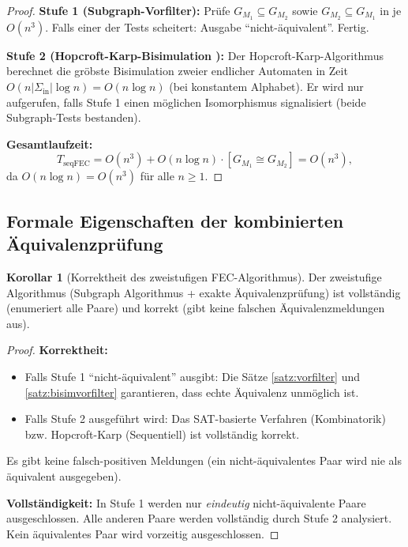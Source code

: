 ﻿\documentclass[a4paper,12pt]{article}
\theoremstyle{definition}
\newtheorem{korollar}{Korollar}
\begin{document}
\begin{proof}
  \textbf{Stufe 1 (Subgraph-Vorfilter):}
  Prüfe $G_{M_1} \subseteq G_{M_2}$ sowie $G_{M_2} \subseteq G_{M_1}$ in je $O(n^3)$.
  Falls einer der Tests scheitert: Ausgabe ``nicht-äquivalent''. Fertig.

  \textbf{Stufe 2 (Hopcroft-Karp-Bisimulation \cite{hopcroft1971}):}
  Der Hopcroft-Karp-Algorithmus berechnet die gröbste Bisimulation zweier endlicher
  Automaten in Zeit $O(n |\Sigma_{\text{in}}| \log n) = O(n \log n)$ (bei konstantem
  Alphabet). Er wird nur aufgerufen, falls Stufe 1 einen möglichen Isomorphismus
  signalisiert (beide Subgraph-Tests bestanden).

  \textbf{Gesamtlaufzeit:}
  \[
    T_{\text{seqFEC}} = O(n^3) + O(n \log n) \cdot [G_{M_1} \cong G_{M_2}]
    = O(n^3),
  \]
  da $O(n \log n) = O(n^3)$ für alle $n \geq 1$.
\end{proof}

\subsection{Formale Eigenschaften der kombinierten Äquivalenzprüfung}

\begin{korollar}[Korrektheit des zweistufigen FEC-Algorithmus]\label{kor:feckorrekt}
  Der zweistufige Algorithmus (Subgraph Algorithmus + exakte Äquivalenzprüfung) ist
  vollständig (enumeriert alle Paare) und korrekt (gibt keine falschen Äquivalenzmeldungen
  aus).
\end{korollar}

\begin{proof}
  \textbf{Korrektheit:}
  \begin{itemize}
    \item Falls Stufe 1 ``nicht-äquivalent'' ausgibt: Die Sätze \ref{satz:vorfilter}
          und \ref{satz:bisimvorfilter} garantieren, dass echte Äquivalenz unmöglich ist.
    \item Falls Stufe 2 ausgeführt wird: Das SAT-basierte Verfahren (Kombinatorik) bzw.
          Hopcroft-Karp (Sequentiell) ist vollständig korrekt.
  \end{itemize}
  Es gibt keine falsch-positiven Meldungen (ein nicht-äquivalentes Paar wird nie als
  äquivalent ausgegeben).

  \textbf{Vollständigkeit:} In Stufe 1 werden nur \emph{eindeutig} nicht-äquivalente
  Paare ausgeschlossen. Alle anderen Paare werden vollständig durch Stufe 2 analysiert.
  Kein äquivalentes Paar wird vorzeitig ausgeschlossen.
\end{proof}
\end{document}
